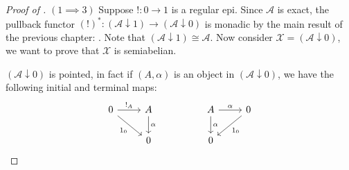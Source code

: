 \begin{subbox}{}
    \begin{proof}[\textit{Proof of }]\label{The proof}
        $\mathit{(1\implies 3)}$ Suppose $! : 0 \to 1$ is a regular epi. Since $\mathcal{A}$ is exact, the pullback functor $(!)^*: (\mathcal{A} \downarrow 1) \to (\mathcal{A} \downarrow 0)$ is monadic by the main result of the previous chapter: . Note that $(\mathcal{A} \downarrow 1) \cong \mathcal{A}$. Now consider $\mathcal{X} = (\mathcal{A} \downarrow 0)$, we want to prove that $\mathcal{X}$ is semiabelian. 
        
        $(\mathcal{A} \downarrow 0)$ is pointed, in fact if $(A,\alpha)$ is an object in $(\mathcal{A} \downarrow 0)$, we have the following initial and terminal maps:
        \[
\begin{tikzcd}
0 \arrow[r, "!_A"] \arrow[rd, "1_0"'] & A \arrow[d, "\alpha"] &  & A \arrow[r, "\alpha"] \arrow[d, "\alpha"] & 0 \arrow[ld, "1_0"] \\
                                      & 0                     &  & 0                                         &                    
\end{tikzcd}
        \]


\end{proof}
\end{subbox}
